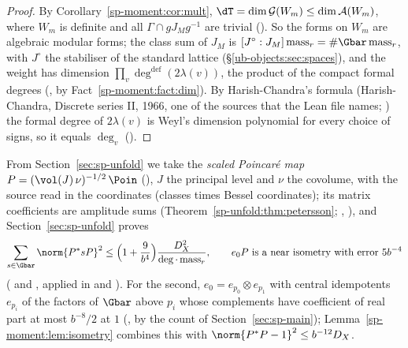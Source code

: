 \begin{proof}
By Corollary~\ref{sp-moment:cor:mult}, $\dT=\dim\mathcal G(W_m)\le\dim\mathcal A(W_m)$, where
$W_m$ is definite and all $\Gamma\cap gJ_Mg^{-1}$ are trivial
(). So the forms on $W_m$ are algebraic modular forms;
the class sum of $J_M$ is $[J^\circ:J_M]\operatorname{mass}_r=\#\Gbar\operatorname{mass}_r$, with $J^\circ$ the
stabiliser of the standard lattice (\S\ref{ub-objects:sec:spaces}), and the
weight has dimension $\prod_v\deg^{\mathrm{def}}(2\lambda(v))$, the product of the compact formal
degrees (, by Fact~\ref{sp-moment:fact:dim}). By
Harish-Chandra's formula (Harish-Chandra, Discrete series II, 1966, one of the sources that the Lean
file names; ) the formal degree
of $2\lambda(v)$ is Weyl's dimension polynomial for every choice of signs, so it equals $\deg_v$
().
\end{proof}

From Section~\ref{sec:sp-unfold} we take the \emph{scaled Poincaré map}
$P=(\vol(J)\,\nu)^{-1/2}\,\Poin$ (), $J$ the principal level and
$\nu$ the covolume, with the source read in the coordinates 
(classes times Bessel coordinates); its matrix coefficients are amplitude sums
(Theorem~\ref{sp-unfold:thm:petersson}; ,
), and Section~\ref{sec:sp-unfold} proves
\begin{equation}\label{sp-moment:eq:moments}
\sum_{s\in\Gbar}\norm{P^*sP}^2\le\Bigl(1+\frac9{b^4}\Bigr)\frac{D_X^2}{\deg\cdot
\operatorname{mass}_r},\qquad\text{$e_0P$ is a near isometry with error $5b^{-4}$}
\end{equation}
( and
, applied in
 and
). For the second, $e_0=e_{p_0}\otimes e_{p_1}$ with central
idempotents $e_{p_i}$ of the factors of $\Gbar$ above $p_i$ whose complements have coefficient
of real part at most $b^{-8}/2$ at $1$ (, by the count
 of Section~\ref{sec:sp-main});
Lemma~\ref{sp-moment:lem:isometry} combines this with $\norm{P^*P-1}^2\le b^{-12}D_X$.

